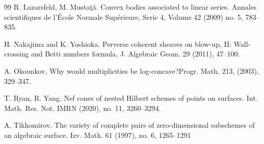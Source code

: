 \documentclass[12pt]{amsart}
\numberwithin{equation}{section}
\theoremstyle{definition}
\begin{document}
\begin{thebibliography}{99}
R. Lazarsfeld, M. Musta\c{t}\u{a}. Convex bodies associated to linear series. Annales scientifiques de l'École Normale Supérieure,  Serie 4,  Volume 42 (2009) no. 5, 783--835.

 H. Nakajima and K. Yoshioka. Perverse coherent sheaves on blow-up, II: Wall-crossing and Betti
numbers formula, J. Algebraic Geom. 29 (2011), 47–100.

A. Okounkov, Why would multiplicities be log-concave?Progr. Math. 213, (2003), 329--347.

 T. Ryan, R. Yang. Nef cones of nested Hilbert schemes of points on surfaces.
Int. Math. Res. Not. IMRN (2020), no. 11, 3260--3294.

 A. Tikhomirov. The variety of complete pairs of zero-dimensional subschemes of an algebraic surface.
Izv. Math. 61 (1997), no. 6, 1265--1291




\end{thebibliography}
\end{document}
